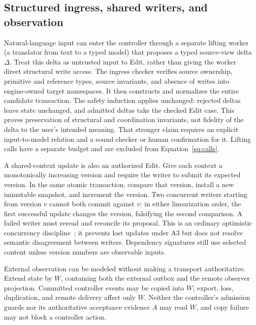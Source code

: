 \documentclass[pdflatex,sn-mathphys-num]{sn-jnl}
\theoremstyle{thmstyleone}
\theoremstyle{thmstylethree}
\theoremstyle{thmstyletwo}
\begin{document}
\subsection{Structured ingress, shared writers, and observation}\label{sec:extensions}
Natural-language input can enter the controller through a separate lifting worker (a translator from text to a typed model) that proposes a typed source-view delta $\Delta$. Treat this delta as untrusted input to Edit, rather than giving the worker direct structural write access. The ingress checker verifies source ownership, primitive and reference types, source invariants, and absence of writes into engine-owned target namespaces. It then constructs and normalizes the entire candidate transaction. The safety induction applies unchanged: rejected deltas leave state unchanged, and admitted deltas take the checked Edit case. This proves preservation of structural and coordination invariants, not fidelity of the delta to the user's intended meaning. That stronger claim requires an explicit input-to-model relation and a sound checker or human confirmation for it. Lifting calls have a separate budget and are excluded from Equation~\eqref{eq:calls}.

A shared-context update is also an authorized Edit. Give each context a monotonically increasing version and require the writer to submit its expected version. In the same atomic transaction, compare that version, install a new immutable snapshot, and increment the version. Two concurrent writers starting from version $v$ cannot both commit against $v$: in either linearization order, the first successful update changes the version, falsifying the second comparison. A failed writer must reread and reconcile its proposal. This is an ordinary optimistic concurrency discipline~\cite{occ}; it prevents lost updates under A3 but does not resolve semantic disagreement between writers. Dependency signatures still use selected content unless version numbers are observable inputs.

External observation can be modeled without making a transport authoritative. Extend state by $W$, containing both the external outbox and the remote observer projection. Committed controller events may be copied into $W$; export, loss, duplication, and remote delivery affect only $W$. Neither the controller's admission guards nor its authoritative acceptance evidence $A$ may read $W$, and copy failure may not block a controller action.
\end{document}
